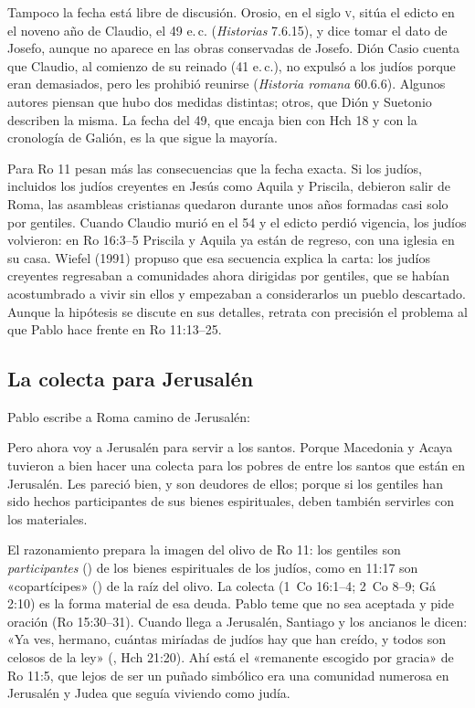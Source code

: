 Tampoco la fecha está libre de discusión. Orosio, en el siglo \textsc{v}, sitúa el edicto en el noveno año de Claudio, el 49 e.\,c. (\emph{Historias} 7.6.15), y dice tomar el dato de Josefo, aunque no aparece en las obras conservadas de Josefo. Dión Casio cuenta que Claudio, al comienzo de su reinado (41 e.\,c.), no expulsó a los judíos porque eran demasiados, pero les prohibió reunirse (\emph{Historia romana} 60.6.6). Algunos autores piensan que hubo dos medidas distintas; otros, que Dión y Suetonio describen la misma. La fecha del 49, que encaja bien con Hch 18 y con la cronología de Galión, es la que sigue la mayoría.

Para Ro 11 pesan más las consecuencias que la fecha exacta. Si los judíos, incluidos los judíos creyentes en Jesús como Aquila y Priscila, debieron salir de Roma, las asambleas cristianas quedaron durante unos años formadas casi solo por gentiles. Cuando Claudio murió en el 54 y el edicto perdió vigencia, los judíos volvieron: en Ro 16:3--5 Priscila y Aquila ya están de regreso, con una iglesia en su casa. Wiefel (1991) propuso que esa secuencia explica la carta: los judíos creyentes regresaban a comunidades ahora dirigidas por gentiles, que se habían acostumbrado a vivir sin ellos y empezaban a considerarlos un pueblo descartado. Aunque la hipótesis se discute en sus detalles, retrata con precisión el problema al que Pablo hace frente en Ro 11:13--25.

\subsection{La colecta para Jerusalén}
Pablo escribe a Roma camino de Jerusalén:
\begin{cita}Pero ahora voy a Jerusalén para servir a los santos. Porque Macedonia y Acaya tuvieron a bien hacer una colecta para los pobres de entre los santos que están en Jerusalén. Les pareció bien, y son deudores de ellos; porque si los gentiles han sido hechos participantes de sus bienes espirituales, deben también servirles con los materiales.\end{cita}
El razonamiento prepara la imagen del olivo de Ro 11: los gentiles son \emph{participantes} () de los bienes espirituales de los judíos, como en 11:17 son «copartícipes» () de la raíz del olivo. La colecta (1~Co 16:1--4; 2~Co 8--9; Gá 2:10) es la forma material de esa deuda. Pablo teme que no sea aceptada y pide oración (Ro 15:30--31). Cuando llega a Jerusalén, Santiago y los ancianos le dicen: «Ya ves, hermano, cuántas miríadas de judíos hay que han creído, y todos son celosos de la ley» (, Hch 21:20). Ahí está el «remanente escogido por gracia» de Ro 11:5, que lejos de ser un puñado simbólico era una comunidad numerosa en Jerusalén y Judea que seguía viviendo como judía.

